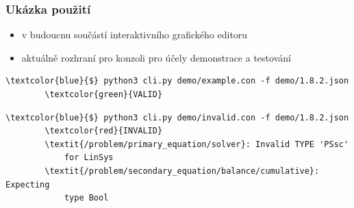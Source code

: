 \documentclass{beamer}
\begin{document}

\begin{frame}[fragile]
	\frametitle{Ukázka použití}
	\begin{itemize}
		\item v budoucnu součástí interaktivního grafického editoru
		\item aktuálně rozhraní pro konzoli pro účely demonstrace a testování
	\end{itemize}
	\noindent
	\footnotesize\begin{Verbatim}[commandchars=\\\{\}]
		\textcolor{blue}{$} python3 cli.py demo/example.con -f demo/1.8.2.json
		\textcolor{green}{VALID}
	\end{Verbatim}
	\footnotesize\begin{Verbatim}[commandchars=\\\{\}]
		\textcolor{blue}{$} python3 cli.py demo/invalid.con -f demo/1.8.2.json
		\textcolor{red}{INVALID}
		\textit{/problem/primary_equation/solver}: Invalid TYPE 'PSsc' 
		    for LinSys
		\textit{/problem/secondary_equation/balance/cumulative}: Expecting 
		    type Bool
	\end{Verbatim}
	\normalsize
\end{frame}
\end{document}
